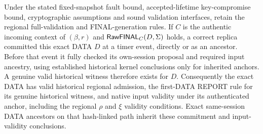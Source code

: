 \begin{proposition}
\label{prop:final-kernel-soundness}
Under the stated fixed-snapshot fault bound, accepted-lifetime
key-compromise bound, cryptographic assumptions and sound validation
interfaces, retain the regional full-validation and FINAL-generation
rules. If $C$ is the authentic incoming context of $(\beta,r)$ and
$\mathsf{RawFINAL}_C(D,\Sigma)$ holds, a correct replica committed this
exact DATA $D$ at a timer event, directly or as an ancestor. Before that
event it fully checked its own-session proposal and required input
ancestry, using established historical kernel conclusions only for
inherited anchors. A genuine valid historical witness therefore exists
for $D$. Consequently the exact DATA has
valid historical regional admission, the first-DATA REPORT rule for
its genuine historical witness, and native input validity under
its authenticated anchor, including the regional $\rho$ and $\xi$
validity conditions. Exact same-session
DATA ancestors on that hash-linked path inherit these commitment and
input-validity conclusions.
\end{proposition}
